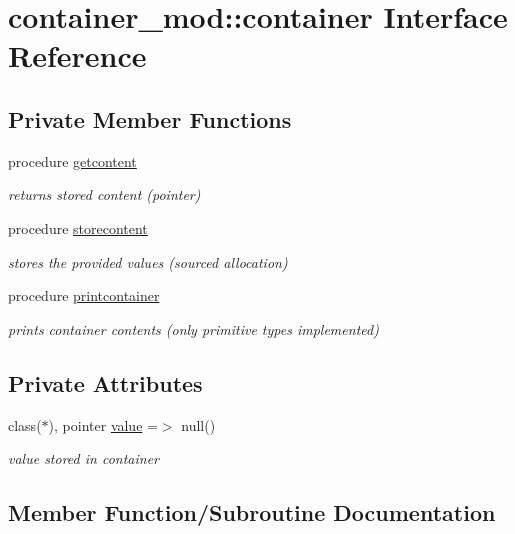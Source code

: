 \hypertarget{structcontainer__mod_1_1container}{}\section{container\+\_\+mod\+:\+:container Interface Reference}
\label{structcontainer__mod_1_1container}
\subsection*{Private Member Functions}
\begin{DoxyCompactItemize}
\item 
procedure \hyperlink{structcontainer__mod_1_1container_abe1540dea98e715a935b91c662a2d81a}{getcontent}
\begin{DoxyCompactList}\small\item\em returns stored content (pointer) \end{DoxyCompactList}\item 
procedure \hyperlink{structcontainer__mod_1_1container_a15e46e6f457bb49604ccf191780f6638}{storecontent}
\begin{DoxyCompactList}\small\item\em stores the provided values (sourced allocation) \end{DoxyCompactList}\item 
procedure \hyperlink{structcontainer__mod_1_1container_ac62ed00e4c79b7c758a5efbc9cc1909a}{printcontainer}
\begin{DoxyCompactList}\small\item\em prints container contents (only primitive types implemented) \end{DoxyCompactList}\end{DoxyCompactItemize}
\subsection*{Private Attributes}
\begin{DoxyCompactItemize}
\item 
class($\ast$), pointer \hyperlink{structcontainer__mod_1_1container_a297f4632156bf226aa8599a7f0cd55c0}{value} =$>$ null()
\begin{DoxyCompactList}\small\item\em value stored in container \end{DoxyCompactList}\end{DoxyCompactItemize}


\subsection{Member Function/\+Subroutine Documentation}
\mbox{\label{structcontainer__mod_1_1container_abe1540dea98e715a935b91c662a2d81a}} 
